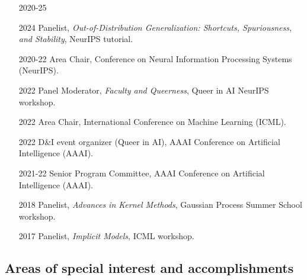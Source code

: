 \documentclass[10pt]{article}
\begin{document}
\begin{itemize}[leftmargin=5em]
  \item[2020-25] 
  \item[2024] Panelist, \emph{Out-of-Distribution Generalization: Shortcuts, Spuriousness, and Stability}, NeurIPS tutorial.
  \item[2020-22] Area Chair, Conference on Neural Information Processing Systems (NeurIPS).
  \item[2022] {Panel Moderator, \emph{Faculty and Queerness}, Queer in AI NeurIPS workshop.}
  \item[2022] {Area Chair, International Conference on Machine Learning (ICML).}
  \item[2022] {D\&I event organizer (Queer in AI), AAAI Conference on Artificial Intelligence (AAAI).}
  \item[2021-22] {Senior Program Committee, AAAI Conference on Artificial Intelligence (AAAI).}
  \item[2018] Panelist, \emph{Advances in Kernel Methods}, Gaussian Process Summer School workshop.
  \item[2017] Panelist, \emph{Implicit Models}, ICML workshop.
\end{itemize}









\subsection{Areas of special interest and accomplishments}
\end{document}
